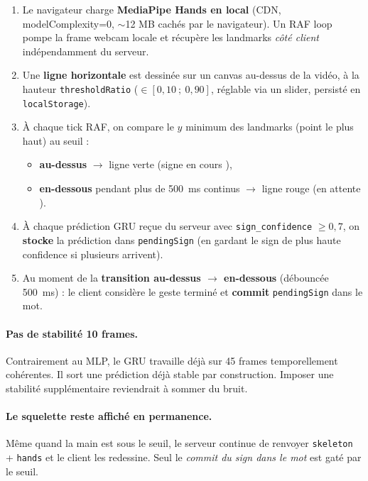 \documentclass[11pt,a4paper]{article}
\begin{document}
\begin{enumerate}[leftmargin=*, itemsep=3pt]
  \item Le navigateur charge \textbf{MediaPipe Hands en local} (CDN,
        modelComplexity=0, $\sim$12 MB cach\'es par le navigateur).
        Un RAF loop pompe la frame webcam locale et r\'ecup\`ere les
        landmarks \emph{c\^ot\'e client} ind\'ependamment du serveur.
  \item Une \textbf{ligne horizontale} est dessin\'ee sur un canvas
        au-dessus de la vid\'eo, \`a la hauteur \texttt{thresholdRatio}
        ($\in [0{,}10\ ;\ 0{,}90]$, r\'eglable via un slider, persist\'e
        en \texttt{localStorage}).
  \item \`A chaque tick RAF, on compare le $y$ minimum des landmarks
        (point le plus haut) au seuil :
        \begin{itemize}[leftmargin=*, itemsep=0pt]
          \item \textbf{au-dessus} $\to$ ligne verte (\og signe en
                cours \fg{}),
          \item \textbf{en-dessous} pendant plus de 500~ms continus
                $\to$ ligne rouge (\og en attente \fg{}).
        \end{itemize}
  \item \`A chaque pr\'ediction GRU re\c{c}ue du serveur avec
        \texttt{sign\_confidence} $\geq 0{,}7$, on \textbf{stocke}
        la pr\'ediction dans \texttt{pendingSign} (en gardant le sign
        de plus haute confidence si plusieurs arrivent).
  \item Au moment de la \textbf{transition au-dessus $\to$ en-dessous}
        (d\'ebounc\'ee 500~ms) : le client consid\`ere le geste termin\'e
        et \textbf{commit} \texttt{pendingSign} dans le mot.
\end{enumerate}

\paragraph{Pas de stabilit\'e 10 frames.} Contrairement au MLP, le
GRU travaille d\'ej\`a sur 45 frames temporellement coh\'erentes. Il
sort une pr\'ediction d\'ej\`a stable par construction. Imposer une
stabilit\'e suppl\'ementaire reviendrait \`a sommer du bruit.

\paragraph{Le squelette reste affich\'e en permanence.} M\^eme quand la
main est sous le seuil, le serveur continue de renvoyer
\texttt{skeleton} + \texttt{hands} et le client les redessine. Seul le
\emph{commit du sign dans le mot} est gat\'e par le seuil.
\end{document}
